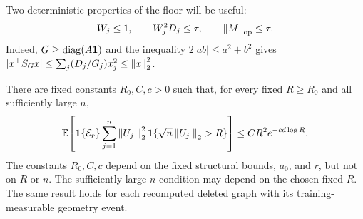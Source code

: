 Two deterministic properties of the floor will be useful:
\begin{equation}
 W_j\le1,\qquad W_j^2D_j\le\tau,
 \qquad \left\lVert M\right\rVert_{\mathrm{op}}\le\tau.
 \label{restore:tail-floor-operator}
\end{equation}
Indeed, $G\ge\operatorname{diag}(A\mathbf 1)$ and the inequality
$2|ab|\le a^2+b^2$ gives
$|x^\top S_Gx|\le\sum_j(D_j/G_j)x_j^2\le\left\lVert x\right\rVert_2^2$.

\begin{lemma}
\label{restore:tail-energy-lemma}
There are fixed constants $R_0,C,c>0$ such that, for every fixed
$R\ge R_0$ and all sufficiently large $n$,
\begin{equation}
 \mathbb E\!\left[\mathbf1\{\mathcal E_r\}
       \sum_{j=1}^n\left\lVert U_{j\cdot}\right\rVert_2^2
                  \mathbf1\{\sqrt n\left\lVert U_{j\cdot}\right\rVert_2>R\}\right]
 \le CR^2e^{-cd\log R}.
 \label{restore:tail-energy}
\end{equation}
The constants $R_0,C,c$ depend on the fixed structural bounds,
$a_0$, and $r$, but not on $R$ or $n$.  The sufficiently-large-$n$
condition may depend on the chosen fixed $R$.  The same result holds
for each recomputed deleted graph with its training-measurable
geometry event.
\end{lemma}

